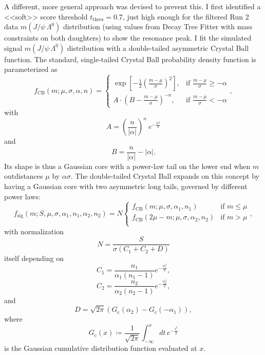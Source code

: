 A different, more general approach was devised to prevent this.
I first identified a <<soft>> score threshold $t_\text{thres} = 0.7$, just high enough for the filtered Run 2 data $m(J/\psi\,\Lambda^0)$ distribution (using values from Decay Tree Fitter with mass constraints on both \lbz daughters) to show the \lbz resonance peak.
I fit the simulated signal $m(J/\psi\,\Lambda^0)$ distribution with a double-tailed asymmetric Crystal Ball function.
The standard, single-tailed Crystal Ball probability density function is parameterized as
\begin{equation}
	f_\text{CB}(m; \mu, \sigma, \alpha, n) =
	\begin{cases}
		\exp\left[ -\frac{1}{2} {\left(\frac{m-\mu}{\sigma}\right)}^2 \right],
		& \text{if } \frac{m-\mu}{\sigma} \geq -\alpha \\
		A \cdot {\left(B - \frac{m-\mu}{\sigma}\right)}^{-n},
		& \text{if } \frac{m-\mu}{\sigma} < -\alpha
	\end{cases},
	\label{eq:4:crystal_ball}
\end{equation}
with
\begin{equation}
	A = {\left(\frac{n}{|\alpha|}\right)}^n~e^{-\frac{\alpha^2}{2}}
\end{equation}
and
\begin{equation}
	B = \frac{n}{|\alpha|} - |\alpha|.
\end{equation}
Its shape is thus a Gaussian core with a power-law tail on the lower end when $m$ outdistances $\mu$ by $\alpha\sigma$.
The double-tailed Crystal Ball expands on this concept by having a Gaussian core with two asymmetric long tails, governed by different power laws:
\begin{equation}
	f_\text{sig}
	\left(m; S, \mu, \sigma, \alpha_1, n_1, \alpha_2, n_2 \right) =
	N
	\begin{cases}
	f_\text{CB}(m; \mu, \sigma, \alpha_1, n_1)
	& \text{if } m \leq \mu \\
	f_\text{CB}(2\mu -m; \mu, \sigma, \alpha_2, n_2)
	& \text{if } m > \mu \\
	\end{cases},
\end{equation}
with normalization
\begin{equation}
	N = \frac{S}{\sigma(C_1 + C_2 + D)}
\end{equation}
itself depending on
\begin{equation}
	C_1 = \frac{n_1}{\alpha_1 (n_1-1)} e^{-\frac{\alpha^2_1}{2}},
\end{equation}
\begin{equation}
	C_2 = \frac{n_2}{\alpha_2 (n_2-1)} e^{-\frac{\alpha^2_2}{2}},
\end{equation}
and
\begin{equation}
	D = \sqrt{2\pi} \left(G_\text{c} (\alpha_2) - G_\text{c} (- \alpha_1)\right),
\end{equation}
where
\begin{equation}
G_\text{c}(x) \coloneqq \frac{1}{\sqrt{2\pi}} \int_{-\infty}^x dt\,e^{-\frac{t^2}{2}}
\end{equation}
is the Gaussian cumulative distribution function evaluated at $x$.

